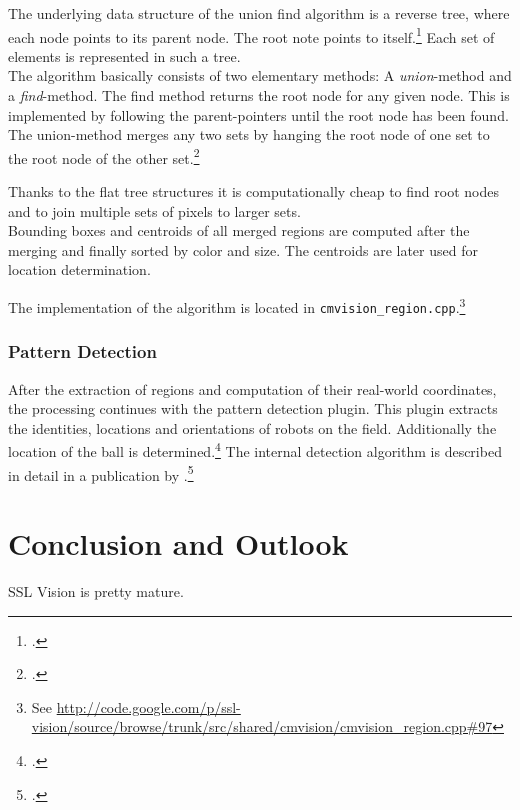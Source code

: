 The underlying data structure of the union find algorithm is a reverse tree, where each node points to its parent node.
The root note points to itself.\footcite[Cf.][]{wa_union_find}
Each set of elements is represented in such a tree.\\
The algorithm basically consists of two elementary methods: A \textit{union}-method and a \textit{find}-method.
The find method returns the root node for any given node. This is implemented by following the parent-pointers
until the root node has been found. The union-method merges any two sets by hanging the root node of one set to the
root node of the other set.\footcite[Cf.][]{wa_union_find}

Thanks to the flat tree structures it is computationally cheap to find root nodes and to join multiple sets of pixels
to larger sets.\\
Bounding boxes and centroids of all merged regions are computed after the merging and finally
sorted by color and size. The centroids are later used for location determination.

The implementation of the algorithm is located in
\texttt{cmvision\_region.cpp}.\footnote{See
\url{http://code.google.com/p/ssl-vision/source/browse/trunk/src/shared/cmvision/cmvision_region.cpp\#97}}




\subsubsection{Pattern Detection}
After the extraction of regions and computation of their real-world coordinates,
the processing continues with the pattern detection plugin.
This plugin extracts the identities, locations and orientations of robots on the field.
Additionally the location of the ball is determined.\footcite[Cf.][p. 6 et sq.]{zickler_ssl_vision}
The internal detection algorithm
is described in detail in a publication by \citeauthor{bruce_2003}.\footcite[Cf.][]{bruce_2003}


\clearpage
\section{Conclusion and Outlook}
\label{sec:conclusion}
SSL Vision is pretty mature.



